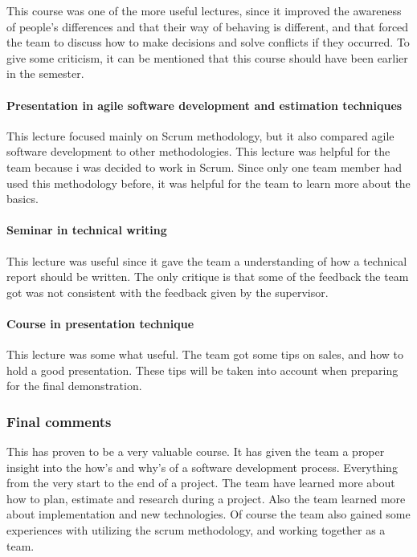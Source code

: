 This course was one of the more useful lectures, since it improved the awareness of people's differences
and that their way of behaving is different, and that forced the team to discuss how to make decisions and solve conflicts if they occurred. To give some criticism, it can be mentioned that this course should have been earlier in the semester.

\paragraph{Presentation in agile software development and estimation techniques}
This lecture focused mainly on Scrum methodology, but it also compared agile software development to other methodologies. This lecture was helpful for the team because i was decided to work in Scrum. Since only one team member had used this methodology before, it was helpful for the team to learn more about the basics. 

\paragraph{Seminar in technical writing}
This lecture was useful since it gave the team a understanding of how a technical report should be written. The only critique is that some of the feedback the team got was not consistent with the feedback given by the supervisor.

\paragraph{Course in presentation technique}
This lecture was some what useful. The team got some tips on sales, and how to hold a good presentation. These tips will be taken into account when preparing for the final demonstration. 

\subsubsection{Final comments}

This has proven to be a very valuable course. It has given the team a proper insight into the how's and why's of a software development process. Everything from the very start to the end of a project. The team have learned more about how to plan, estimate and research during a project. Also the team learned more about implementation and new technologies. Of course the team also gained some experiences with utilizing the scrum methodology, and working together as a team. 


